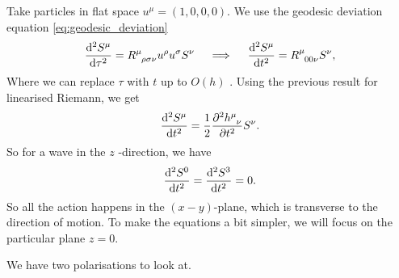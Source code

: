 Take particles in flat space $u^{\mu} = (1, 0, 0, 0)$. We use the geodesic deviation equation \eqref{eq:geodesic_deviation}
\begin{equation}
  \dv[2]{S^{\mu}}{\tau} = R\indices{^{\mu}_{\rho\sigma\nu}} u^{\rho} u^{\sigma} S^{\nu} \quad \implies \quad \dv[2]{S^{\mu}}{t} = R\indices{^{\mu}_{00\nu}} S^{\nu},
\end{equation}
Where we can replace $\tau$  with $t$  up to $O(h)$ . Using the previous result for linearised Riemann, we get
\begin{equation}
  \dv[2]{S^{\mu}}{t} = \frac{1}{2} \frac{\partial^2 h\indices{^{\mu}_{\nu}}}{\partial t^2} S^{\nu}.
\end{equation}
So for a wave in the $z$ -direction, we have
\begin{equation}
  \dv[2]{S^0}{t} = \dv[2]{S^3}{t} = 0.
\end{equation}
So all the action happens in the $(x-y)$-plane, which is transverse to the direction of motion.
To make the equations a bit simpler, we will focus on the particular plane $z = 0$.

We have two polarisations to look at.

